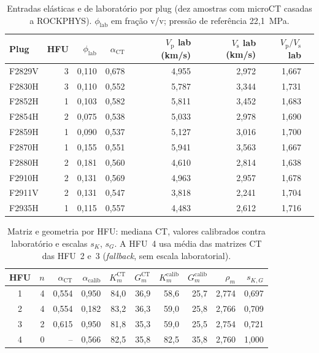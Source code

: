 \documentclass[11pt,a4paper]{article}
\numberwithin{equation}{section}
\newcommand{\Vp}{\ensuremath{V_{\mathrm{p}}}}
\newcommand{\Vs}{\ensuremath{V_{\mathrm{s}}}}
\newcommand{\VpVs}{\ensuremath{V_{\mathrm{p}}/V_{\mathrm{s}}}}
\begin{document}
\begin{table}[H]
  \centering
  \caption{Entradas elásticas e de laboratório por plug (dez amostras com
           microCT casadas a ROCKPHYS). $\phi_{\mathrm{lab}}$ em fração v/v;
           pressão de referência 22,1~MPa.}
  \label{tab:app_plug_lab}
  \scriptsize
  \setlength{\tabcolsep}{4pt}
  \begin{tabular}{lrrrrrrr}
    \toprule
    Plug & HFU & $\phi_{\mathrm{lab}}$ &
    $\alpha_{\mathrm{CT}}$ &
    \Vp{} lab (km/s) & \Vs{} lab (km/s) & \VpVs{} lab \\
    \midrule
    F2829V & 3 & 0,110 & 0,678 & 4,955 & 2,972 & 1,667 \\
    F2830H & 3 & 0,110 & 0,552 & 5,787 & 3,344 & 1,731 \\
    F2852H & 1 & 0,103 & 0,582 & 5,811 & 3,452 & 1,683 \\
    F2854H & 2 & 0,075 & 0,538 & 5,033 & 2,978 & 1,690 \\
    F2859H & 1 & 0,090 & 0,537 & 5,127 & 3,016 & 1,700 \\
    F2870H & 1 & 0,155 & 0,551 & 5,941 & 3,563 & 1,667 \\
    F2880H & 2 & 0,181 & 0,560 & 4,610 & 2,814 & 1,638 \\
    F2910H & 2 & 0,131 & 0,569 & 4,963 & 2,957 & 1,678 \\
    F2911V & 2 & 0,131 & 0,547 & 3,818 & 2,241 & 1,704 \\
    F2935H & 1 & 0,115 & 0,557 & 4,483 & 2,612 & 1,716 \\
    \bottomrule
  \end{tabular}
\end{table}

\begin{table}[H]
  \centering
  \caption{Matriz e geometria por HFU: mediana CT, valores calibrados contra
           laboratório e escalas $s_K$, $s_G$. A HFU~4 usa média das matrizes
           CT das HFU~2 e~3 (\emph{fallback}, sem escala laboratorial).}
  \label{tab:app_hfu_matrix}
  \small
  \setlength{\tabcolsep}{3pt}
  \begin{tabular}{crrrrrrrrr}
    \toprule
    HFU & $n$ &
    $\alpha_{\mathrm{CT}}$ & $\alpha_{\mathrm{calib}}$ &
    $K_m^{\mathrm{CT}}$ & $G_m^{\mathrm{CT}}$ &
    $K_m^{\mathrm{calib}}$ & $G_m^{\mathrm{calib}}$ &
  $\rho_m$ & $s_{K,G}$ \\
    \midrule
    1 & 4 & 0,554 & 0,950 & 84,0 & 36,9 & 58,6 & 25,7 & 2,774 & 0,697 \\
    2 & 4 & 0,554 & 0,182 & 83,2 & 36,3 & 59,0 & 25,8 & 2,766 & 0,709 \\
    3 & 2 & 0,615 & 0,950 & 81,8 & 35,3 & 59,0 & 25,5 & 2,754 & 0,721 \\
    4 & 0 & --    & 0,566 & 82,5 & 35,8 & 82,5 & 35,8 & 2,760 & 1,000 \\
    \bottomrule
  \end{tabular}
\end{table}
\end{document}
